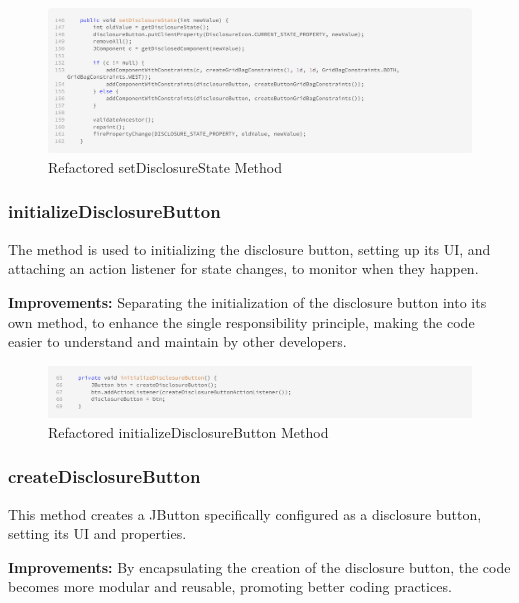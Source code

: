 \begin{figure}[H]
    \centering
    \includegraphics[width=\linewidth]{pic/F setDisclosureState.png}
    \caption{Refactored setDisclosureState Method}
    \label{fig:Refactored setDisclosureState Method}
\end{figure}






\subsubsection{initializeDisclosureButton}
The method is used to initializing the disclosure button, setting up its UI, and attaching an action listener for state changes,
to monitor when they happen.

\textbf{Improvements:} Separating the initialization of the disclosure button into its own method, to enhance the single responsibility principle,
making the code easier to understand and maintain by other developers.

\begin{figure}[H]
    \centering
    \includegraphics[width=\linewidth]{pic/F initializeDisclosureButton.png}
    \caption{Refactored initializeDisclosureButton Method}
    \label{fig:Refactored initializeDisclosureButton Method}
\end{figure}





\subsubsection{createDisclosureButton}
This method creates a JButton specifically configured as a disclosure button, setting its UI and properties.

\textbf{Improvements:} By encapsulating the creation of the disclosure button,
the code becomes more modular and reusable, promoting better coding practices.

